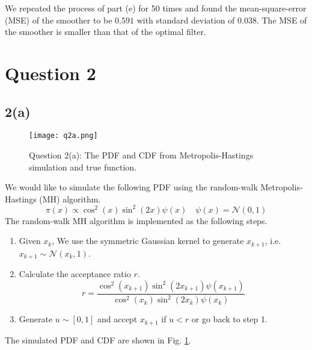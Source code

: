 \documentclass[a4paper, 11pt]{article}
\begin{document}
We repeated the process of part (e) for 50 times and found the mean-square-error (MSE) of the smoother to be $0.591$ with standard deviation of $0.038$. The MSE of the smoother is smaller than that of the optimal filter. 











\section*{Question 2}
\subsection*{2(a)}


\begin{figure}
	\begin{center}
		\texttt{[image: q2a.png]}
		\caption{Question 2(a): The PDF and CDF from Metropolis-Hastings simulation and true function. }
	\end{center}
	\label{fig:q2a}
\end{figure}

We would like to simulate the following PDF using the random-walk Metropolis-Hastings (MH) algorithm. 
\begin{equation}
\pi(x) \propto \cos^2(x)\sin^2(2x)\psi(x) \quad \psi(x) = \mathcal{N}(0,1)
\end{equation}
The random-walk MH algorithm is implemented as the following steps. 
\begin{enumerate}
\item Given $x_k$, We use the symmetric Gaussian kernel to generate $x_{k+1}$, i.e. $x_{k+1}\sim\mathcal{N}(x_k, 1)$. 
\item Calculate the acceptance ratio $r$. 
\begin{equation}
r = \frac{\cos^2(x_{k+1})\sin^2(2x_{k+1})\psi(x_{k+1})}{\cos^2(x_k)\sin^2(2x_k)\psi(x_k)}
\end{equation}
\item Generate $u\sim [0,1]$ and accept $x_{k+1}$ if $u < r$ or go back to step 1. 
\end{enumerate}
The simulated PDF and CDF are shown in Fig. \ref{fig:q2a}. 
\end{document}
